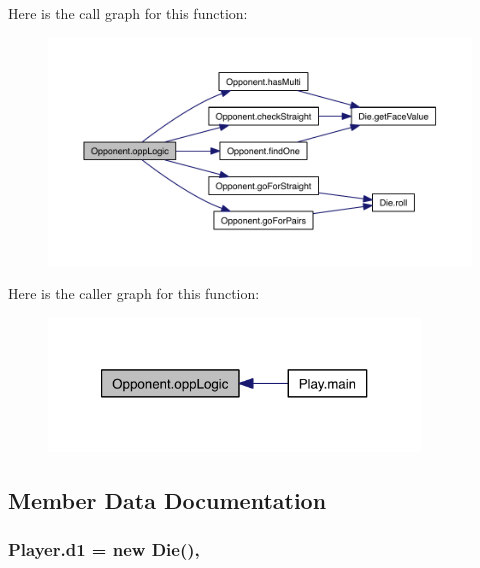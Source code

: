 Here is the call graph for this function\-:\nopagebreak
\begin{figure}[H]
\begin{center}
\leavevmode
\includegraphics[width=350pt]{class_opponent_a21dc0a88cbc3620ab78bf94a1ef3eb83_cgraph}
\end{center}
\end{figure}




Here is the caller graph for this function\-:\nopagebreak
\begin{figure}[H]
\begin{center}
\leavevmode
\includegraphics[width=280pt]{class_opponent_a21dc0a88cbc3620ab78bf94a1ef3eb83_icgraph}
\end{center}
\end{figure}




\subsection{Member Data Documentation}
\hypertarget{class_player_a6a844c97ec2c4a8226625b75e612a509}{
\subsubsection[{d1}]{ Player.\-d1 = new {\bf Die}()\hspace{0.3cm}{\ttfamily [package]}, {\ttfamily [inherited]}}}\label{class_player_a6a844c97ec2c4a8226625b75e612a509}


